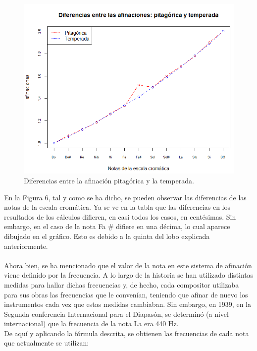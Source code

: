 \documentclass[a4paper, openright, 11pt, titlepage]{report}
\theoremstyle{definition}\newtheorem{defin}[propo]{Definition}
\theoremstyle{definition}\newtheorem{obser}[propo]{Remark}
\theoremstyle{definition}\newtheorem{ejem}[propo]{Ejemplo}
\theoremstyle{definition}\newtheorem{algoritmo}[propo]{Algoritmo}
\begin{document}
\begin{figure}[H]
    \centering
    \includegraphics[scale = 0.8]{graficoCromatica.png}
    \caption{Diferencias entre la afinación pitagórica y la temperada.}
\end{figure}
En la Figura 6, tal y como se ha dicho, se pueden observar las diferencias de las notas de la escala cromática. Ya se ve en la tabla que las diferencias en los resultados de los cálculos difieren, en casi todos los casos, en centésimas. Sin embargo, en el caso de la nota Fa \# difiere en una décima, lo cual aparece dibujado en el gráfico. Esto es debido a la quinta del lobo explicada anteriormente. \\\\
Ahora bien, se ha mencionado que el valor de la nota en este sistema de afinación viene definido por la frecuencia. A lo largo de la historia se han utilizado distintas medidas para hallar dichas frecuencias y, de hecho, cada compositor utilizaba para sus obras las frecuencias que le convenían, teniendo que afinar de nuevo los instrumentos cada vez que estas medidas cambiaban. Sin embargo, en 1939, en la Segunda conferencia Internacional para el Diapasón, se determinó (a nivel internacional) que la frecuencia de la nota La era 440 Hz.\\
De aquí y aplicando la fórmula descrita, se obtienen las frecuencias de cada nota que actualmente se utilizan:
\end{document}
